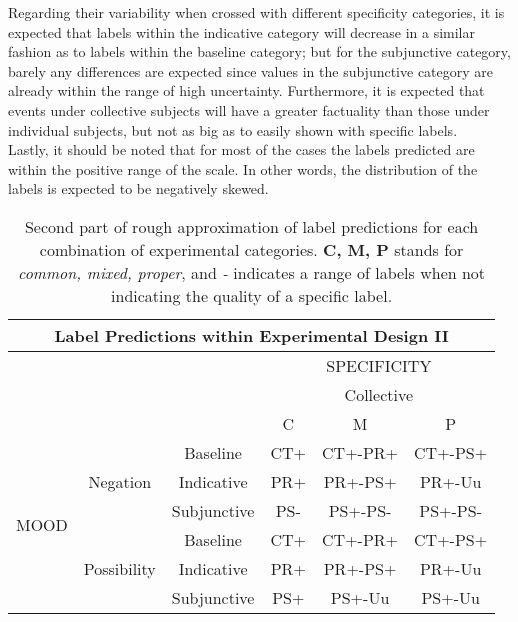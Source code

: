 Regarding their variability when crossed with different specificity categories, it is expected that labels within the indicative category will decrease in a similar fashion as to labels within the baseline category; but for the subjunctive category, barely any differences are expected since values in the subjunctive category are already within the range of high uncertainty. Furthermore, it is expected that events under collective subjects will have a greater factuality than those under individual subjects, but not as big as to easily shown with specific labels.\\

Lastly, it should be noted that for most of the cases the labels predicted are within the positive range of the scale. In other words, the distribution of the labels is expected to be negatively skewed.\\

\begin{table}
\centering
\begin{tabular}{|c|c|c|c|c|c|}
\hline
\multicolumn{6}{|c|}{Label Predictions within Experimental Design II}\\\hline
                      & & &\multicolumn{3}{c|}{SPECIFICITY} \\\cline{4-6} 
                      & & &\multicolumn{3}{c|}{Collective}\\\cline{4-6} 
                      & & & C & M & P \\\hline 
\multirow{6}{*}{MOOD} & \multirow{3}{*}{Negation} & Baseline  & CT+ & CT+-PR+ & CT+-PS+\\\cline{3-6}
                      &                           & Indicative & PR+ & PR+-PS+ & PR+-Uu \\\cline{3-6}
                      &                           & Subjunctive  & PS- & PS+-PS- & PS+-PS-  \\ \cline{2-6}\cline{2-6}                     
                      &\multirow{3}{*}{Possibility}& Baseline & CT+ & CT+-PR+ & CT+-PS+\\\cline{3-6}
                      &                           & Indicative  & PR+ & PR+-PS+ & PR+-Uu\\\cline{3-6}
                      &                           & Subjunctive & PS+ & PS+-Uu & PS+-Uu \\\hline                                                          
\end{tabular}
\caption[Label predictions II.]{Second part of rough approximation of label predictions for each combination of experimental categories. \textbf{C, M, P} stands for \textit{common, mixed, proper}, and \textit{-} indicates a range of labels when not indicating the quality of a specific label.}
\label{tab:pilpredict2}
\end{table}

